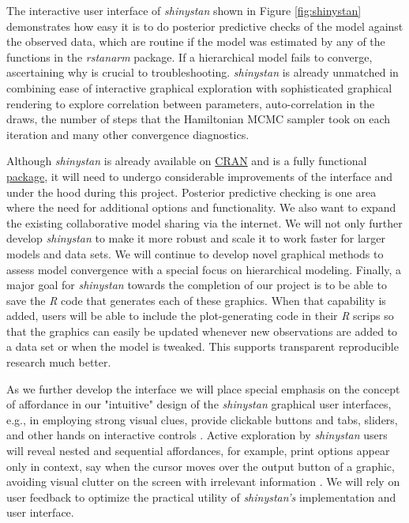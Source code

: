 \documentclass[11pt,notitlepage]{article}
\begin{document}
The interactive user interface of \textit{shinystan} shown in Figure \ref{fig:shinystan} 
demonstrates how easy it is to do posterior predictive checks of the model against the
observed data, which are routine if the model was estimated by any of the
functions in the \textit{rstanarm} package. If a hierarchical 
model fails to converge, ascertaining why is crucial to troubleshooting. \textit{shinystan} 
is already unmatched in combining ease of interactive graphical exploration 
with sophisticated graphical rendering to explore correlation between parameters, auto-correlation
in the draws, the number of steps that the Hamiltonian MCMC sampler took on each iteration and 
many other convergence diagnostics.

Although \textit{shinystan} is already available on \href{https://cran.r-project.org/web/packages/shinystan/index.html}{CRAN} 
and is a fully functional \href{https://www.youtube.com/watch?v=X31xqNHcvQs}{package}, it
will need to undergo considerable improvements of the interface and under the hood during this project. Posterior predictive 
checking is one area where the need for additional options and functionality. We also want to expand the existing collaborative 
model sharing via the internet. We will not only further develop \textit{shinystan} 
to make it more robust and scale it to work faster for larger models and data sets. We will continue to develop novel graphical 
methods to assess model convergence with a special focus on hierarchical modeling. Finally, a
major goal for \textit{shinystan} towards the completion of our project is to be able to save the \textit{R} code that 
generates each of these graphics. When that capability is added, users will be able to
include the plot-generating code in their \textit{R} scrips so that the graphics can 
easily be updated whenever new observations are added to a data set or when the model is tweaked. 
This supports transparent reproducible research much better.

As we further develop the interface we will place special emphasis on the concept of affordance in our "intuitive" 
design of the \textit{shinystan} graphical user interfaces, e.g., in employing strong visual clues, provide clickable buttons and tabs, sliders, and other 
hands on interactive controls \cite{NormanAffordances1999}. Active exploration by \textit{shinystan} users will reveal nested and sequential 
affordances, for example, print options appear only in context, say when the cursor moves over the output button of a graphic, 
avoiding visual clutter on the screen with irrelevant information \cite{Mcgrenere2000affordances}. We will rely on user 
feedback to optimize the practical utility of \textit{shinystan's} implementation and user interface.
\end{document}
